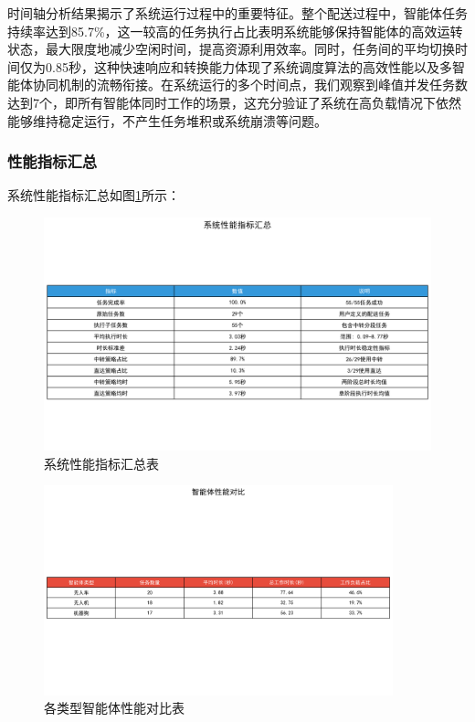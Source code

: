 \documentclass[12pt,a4paper]{article}
\begin{document}
时间轴分析结果揭示了系统运行过程中的重要特征。整个配送过程中，智能体任务持续率达到85.7\%，这一较高的任务执行占比表明系统能够保持智能体的高效运转状态，最大限度地减少空闲时间，提高资源利用效率。同时，任务间的平均切换时间仅为0.85秒，这种快速响应和转换能力体现了系统调度算法的高效性能以及多智能体协同机制的流畅衔接。在系统运行的多个时间点，我们观察到峰值并发任务数达到7个，即所有智能体同时工作的场景，这充分验证了系统在高负载情况下依然能够维持稳定运行，不产生任务堆积或系统崩溃等问题。

\subsubsection{性能指标汇总}

系统性能指标汇总如图\ref{fig:system-performance-table}所示：

\begin{figure}[h]
    \centering
    \includegraphics[width=\textwidth]{analysis_results/system_performance_table_20250617_081500.png}
    \caption{系统性能指标汇总表}
    \label{fig:system-performance-table}
\end{figure}

\begin{figure}[h]
    \centering
    \includegraphics[width=0.9\textwidth]{analysis_results/agent_performance_table_20250617_081500.png}
    \caption{各类型智能体性能对比表}
    \label{fig:agent-performance-table}
\end{figure}
\end{document}
